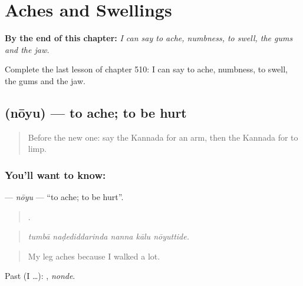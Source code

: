 
\chapter{Aches and Swellings}
\label{ch:ka-aches-and-swellings}

\begin{chapteropening}
\textbf{By the end of this chapter:} \emph{I can say to ache, numbness, to swell, the gums and the jaw.}

Complete the last lesson of chapter 510: I can say to ache, numbness, to swell, the gums and the jaw.
\end{chapteropening}

\section[\texorpdfstring{\kn{ನೋಯು} (nōyu)}{ನೋಯು (nōyu)}]{ (nōyu) — to ache; to be hurt}

\label{lesson:KA-C510-noyu}



\begin{quote}
Before the new one: say the Kannada for an arm, then the Kannada for to limp.
\end{quote}

\subsection*{You'll want to know: }
\textbf{} — \emph{nōyu} — \textquotedblleft{}to ache; to be hurt\textquotedblright{}.

\begin{quote}
    .
\end{quote}

\begin{quote}
\emph{tumbā naḍediddarinda nanna kālu nōyuttide.}
\end{quote}

\begin{quote}
My leg aches because I walked a lot.
\end{quote}

Past (I …): , \emph{nonde}.

